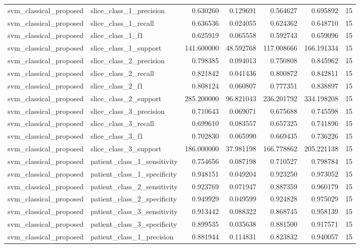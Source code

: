 \begin{tabular}{llrrrrr}
svm_classical_proposed & slice_class_1_precision & 0.630260 & 0.129691 & 0.564627 & 0.695892 & 15 \\
svm_classical_proposed & slice_class_1_recall & 0.636536 & 0.024055 & 0.624362 & 0.648710 & 15 \\
svm_classical_proposed & slice_class_1_f1 & 0.625919 & 0.065558 & 0.592743 & 0.659096 & 15 \\
svm_classical_proposed & slice_class_1_support & 141.600000 & 48.592768 & 117.008666 & 166.191334 & 15 \\
svm_classical_proposed & slice_class_2_precision & 0.798385 & 0.094013 & 0.750808 & 0.845962 & 15 \\
svm_classical_proposed & slice_class_2_recall & 0.821842 & 0.041436 & 0.800872 & 0.842811 & 15 \\
svm_classical_proposed & slice_class_2_f1 & 0.808124 & 0.060807 & 0.777351 & 0.838897 & 15 \\
svm_classical_proposed & slice_class_2_support & 285.200000 & 96.821043 & 236.201792 & 334.198208 & 15 \\
svm_classical_proposed & slice_class_3_precision & 0.710643 & 0.069071 & 0.675688 & 0.745598 & 15 \\
svm_classical_proposed & slice_class_3_recall & 0.699610 & 0.083557 & 0.657325 & 0.741896 & 15 \\
svm_classical_proposed & slice_class_3_f1 & 0.702830 & 0.065990 & 0.669435 & 0.736226 & 15 \\
svm_classical_proposed & slice_class_3_support & 186.000000 & 37.981198 & 166.778862 & 205.221138 & 15 \\
svm_classical_proposed & patient_class_1_sensitivity & 0.754656 & 0.087198 & 0.710527 & 0.798784 & 15 \\
svm_classical_proposed & patient_class_1_specificity & 0.948151 & 0.049204 & 0.923250 & 0.973052 & 15 \\
svm_classical_proposed & patient_class_2_sensitivity & 0.923769 & 0.071947 & 0.887359 & 0.960179 & 15 \\
svm_classical_proposed & patient_class_2_specificity & 0.949929 & 0.049599 & 0.924828 & 0.975029 & 15 \\
svm_classical_proposed & patient_class_3_sensitivity & 0.913442 & 0.088322 & 0.868745 & 0.958139 & 15 \\
svm_classical_proposed & patient_class_3_specificity & 0.899535 & 0.035638 & 0.881500 & 0.917571 & 15 \\
svm_classical_proposed & patient_class_1_precision & 0.881944 & 0.114831 & 0.823832 & 0.940057 & 15 \\

\end{tabular}
